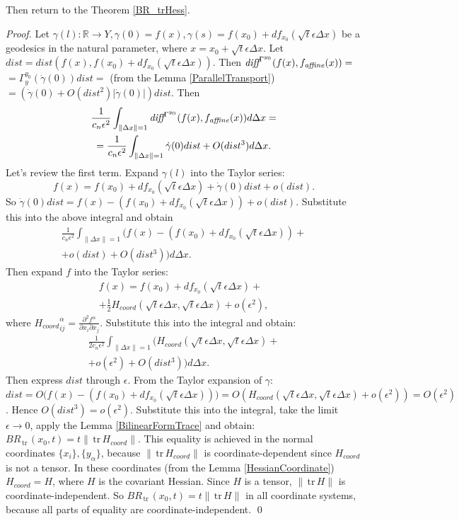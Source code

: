 \documentclass[twocolumn]{svjour3}          %
\newcommand{\diff}{\textit{diff}}
\newcommand{\affine}{\mathop{\it affine}}
\newcommand{\delx}{\Delta x}
\newcommand{\R}{\mathbb{R}}
\newcommand {\tr}{{\,}\mathrm{tr}{\,}}
\begin{document}
Then return to the Theorem \ref{BR_trHess}.
\begin{proof}
Let $\gamma(l):\R \to Y, \gamma(0) = f(x), \gamma(s) = f(x_0) + df_{x_0}(\sqrt{t}\epsilon\delx)$ be a geodesics in the natural parameter, where $x=x_0 + \sqrt{t}\epsilon\delx$. Let $dist = dist(f(x), f(x_0) + df_{x_0}(\sqrt{t}\epsilon\delx))$. Then $\diff^{\Gamma^{y_0}}(f(x), f_{\affine}(x)) =$ \\
$ = \Gamma_y^{y_0}(\dot{\gamma}(0)) dist =$ (from the Lemma \ref{ParallelTransport}) $=(\dot{\gamma}(0) + O(dist^2)|\dot{\gamma}(0)|) dist$. Then 
\begin{multline*}
\frac{1}{c_n \epsilon^2} \int_{\| \delx \| = 1} \diff^{\Gamma^{y_0}}(f(x), f_{\affine}(x)) d\delx = \\
= \frac{1}{c_n \epsilon^2} \int_{\| \delx \| = 1} \dot{\gamma}(0) dist + O(dist^3) d\delx.
\end{multline*}
Let's review the first term. Expand $\gamma(l)$ into the Taylor series:
$$f(x) = f(x_0) + df_{x_0}(\sqrt{t}\epsilon\delx) + \dot{\gamma}(0)dist + o(dist).$$ 
So $\dot{\gamma}(0)dist = f(x) - (f(x_0) + df_{x_0}(\sqrt{t}\epsilon\delx))  + o(dist)$. Substitute this into the above integral and obtain
\begin{multline*}\frac{1}{c_n \epsilon^2} \int_{\| \delx \| = 1} \big( f(x) - (f(x_0) + df_{x_0}(\sqrt{t}\epsilon\delx)) + \\
+ o(dist) + O(dist^3)\big) d\delx.\end{multline*}
Then expand $f$ into the Taylor series:
\begin{multline*}f(x) = f(x_0) + df_{x_0}(\sqrt{t}\epsilon\delx) + \\
+ \frac{1}{2} H_{coord} (\sqrt{t}\epsilon\delx, \sqrt{t}\epsilon\delx) + o(\epsilon^2),\end{multline*}
where ${H_{coord}}_{ij}^{\alpha} = \frac{\partial^2 f^{\alpha}}{\partial x_i \partial x_j}$. Substitute this into the integral and obtain:
\begin{multline*}\frac{1}{2 c_n \epsilon^2} \int_{\| \delx \| = 1} \big( H_{coord} (\sqrt{t}\epsilon\delx, \sqrt{t}\epsilon\delx) + \\
+ o(\epsilon^2) + O(dist^3)\big) d\delx. \end{multline*}
Then express $dist$ through $\epsilon$. From the Taylor expansion of $\gamma$: $dist = O\big(f(x) - (f(x_0) + df_{x_0}(\sqrt{t}\epsilon\delx))\big) = O(H_{coord}(\sqrt{t}\epsilon\delx, \sqrt{t}\epsilon\delx) + o(\epsilon^2)) = O(\epsilon^2)$. Hence $O(dist^3) = o(\epsilon^2)$. Substitute this into the integral, take the limit $\epsilon \to 0$, apply the Lemma \ref{BilinearFormTrace} and obtain: $BR_{\tr}(x_0, t) = t\|\tr H_{coord} \|$. This equality is achieved in the normal coordinates $\{x_i\}, \{y_{\alpha}\}$, because $\|\tr H_{coord} \|$ is coordinate-dependent since $H_{coord}$ is not a tensor. In these coordinates (from the Lemma \ref{HessianCoordinate}) $H_{coord} = H$, where $H$ is the covariant Hessian. Since $H$ is a tensor, $\|\tr H \|$ is coordinate-independent. So $BR_{\tr}(x_0, t) = t\|\tr H \|$ in all coordinate systems, because all parts of equality are coordinate-independent. \qed
\end{proof}
\end{document}
